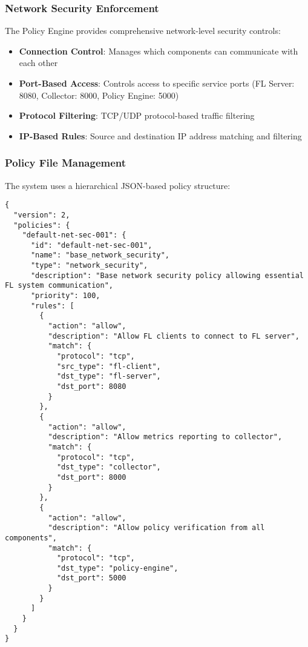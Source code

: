 \subsubsection{Network Security Enforcement}

The Policy Engine provides comprehensive network-level security controls:

\begin{itemize}
    \item \textbf{Connection Control}: Manages which components can communicate with each other
    \item \textbf{Port-Based Access}: Controls access to specific service ports (FL Server: 8080, Collector: 8000, Policy Engine: 5000)
    \item \textbf{Protocol Filtering}: TCP/UDP protocol-based traffic filtering
    \item \textbf{IP-Based Rules}: Source and destination IP address matching and filtering
\end{itemize}

\subsubsection{Policy File Management}

The system uses a hierarchical JSON-based policy structure:
\begin{lstlisting}[style=jsoncode, caption=Policy Configuration Structure]
{
  "version": 2,
  "policies": {
    "default-net-sec-001": {
      "id": "default-net-sec-001",
      "name": "base_network_security",
      "type": "network_security",
      "description": "Base network security policy allowing essential FL system communication",
      "priority": 100,
      "rules": [
        {
          "action": "allow",
          "description": "Allow FL clients to connect to FL server",
          "match": {
            "protocol": "tcp",
            "src_type": "fl-client",
            "dst_type": "fl-server",
            "dst_port": 8080
          }
        },
        {
          "action": "allow",
          "description": "Allow metrics reporting to collector",
          "match": {
            "protocol": "tcp",
            "dst_type": "collector",
            "dst_port": 8000
          }
        },
        {
          "action": "allow",
          "description": "Allow policy verification from all components",
          "match": {
            "protocol": "tcp",
            "dst_type": "policy-engine",
            "dst_port": 5000
          }
        }
      ]
    }
  }
}
\end{lstlisting}

